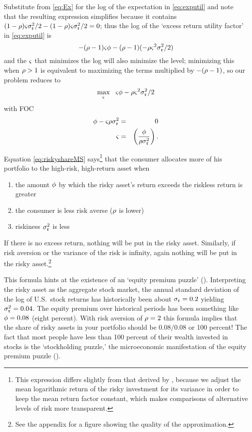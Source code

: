 Substitute from \eqref{eq:Ex} for the log of the expectation in
\eqref{eq:exputil} and note that the resulting expression simplifies because it contains
${(1-\rho){\varsigma}\sigma_{\mathfrak{r}}^{2}/2-(1-\rho){\varsigma}\sigma_{\mathfrak{r}}^{2}/2}=0$;
thus the log of the `excess return utility factor' in \eqref{eq:exputil} is
\begin{equation}
  -(\rho-1){\varsigma} \phi - (\rho-1)(- \rho {\varsigma}^{2}\sigma_{\mathfrak{r}}^{2}/2)
\end{equation}
and the ${\varsigma}$ that minimizes the log will also
minimize the level; minimizing this when $\rho>1$ is equivalent to
maximizing the terms multiplied by $-(\rho-1)$, so our problem
reduces to
\[
\max_{{\varsigma}}~~ {\varsigma} \phi -\rho{\varsigma}^{2}\sigma_{\mathfrak{r}}^{2}/2
\]
with FOC
\begin{eqnarray}
         \phi-{\varsigma}\rho\sigma_{\mathfrak{r}}^{2}  & = & 0  \notag \\
{\varsigma} & = & \left(\frac{\phi}{\rho \sigma_{\mathfrak{r}}^{2}}\right)
. \label{eq:riskyshareMS}
\end{eqnarray}

Equation \eqref{eq:riskyshareMS} says\footnote{This expression differs
  slightly from that derived by \cite{cvAppendix}, because we adjust
  the mean logarithmic return of the risky investment for its variance
  in order to keep the mean return factor constant, which makes
  comparisons of alternative levels of risk more transparent.}  that the
consumer allocates more of his portfolio to the high-risk, high-return
asset when
\begin{enumerate}
\item the amount $\phi$ by which the risky
asset's return exceeds the riskless return is greater
\item the consumer is less risk averse ($\rho$ is lower)
\item riskiness $\sigma^{2}_{\mathfrak{r}}$ is less
\end{enumerate}
If there is no excess return, nothing will be put in the risky asset.  Similarly, if
risk aversion or the variance of the risk is infinity, again nothing
will be put in the risky asset.\footnote{See the appendix for a figure
  showing the quality of the approximation.}

This formula hints at the existence of an `equity premium puzzle'
(\cite{mehra&prescott:puzzle}).  Interpreting the risky asset as the
aggregate stock market, the annual standard deviation of the log of
U.S.\ stock returns has historically been about $\sigma_{\mathfrak{r}}=0.2$
yielding $\sigma_{\mathfrak{r}}^{2} = 0.04$.  The equity premium over historical periods
has been something like $\phi = 0.08$ (eight percent).  With risk
aversion of $\rho=2$ this formula implies that the share of risky
assets in your portfolio should be $0.08/0.08$ or 100 percent!  The
fact that most people have less than 100 percent of their wealth
invested in stocks is the `stockholding puzzle,' the microeconomic
manifestation of the equity premium puzzle
(\cite{haliassos&bertaut:fewholdstocks}).


